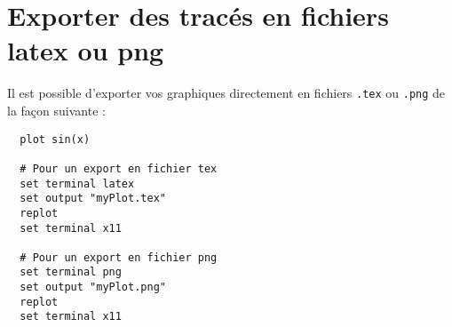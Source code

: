 \documentclass [a4paper]{article}
\begin{document}
\section{Exporter des tracés en fichiers latex ou png}

\noindent
Il est possible d'exporter vos graphiques directement en fichiers \verb?.tex? ou \verb?.png? de la façon suivante :

\begin{verbatim}
  plot sin(x)

  # Pour un export en fichier tex
  set terminal latex
  set output "myPlot.tex"
  replot
  set terminal x11

  # Pour un export en fichier png
  set terminal png
  set output "myPlot.png"
  replot
  set terminal x11
\end{verbatim}
\end{document}
